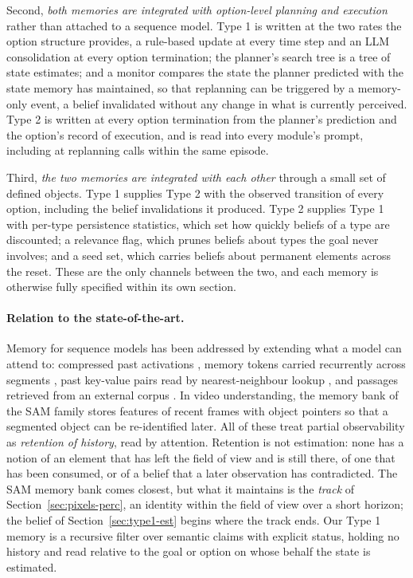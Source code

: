 \documentclass[10pt]{article}
\begin{document}
Second, \emph{both memories are integrated with option-level planning and execution} rather than attached to a sequence model. Type 1 is written at the two rates the option structure provides, a rule-based update at every time step and an LLM consolidation at every option termination; the planner's search tree is a tree of state estimates; and a monitor compares the state the planner predicted with the state memory has maintained, so that replanning can be triggered by a memory-only event, a belief invalidated without any change in what is currently perceived. Type 2 is written at every option termination from the planner's prediction and the option's record of execution, and is read into every module's prompt, including at replanning calls within the same episode.

Third, \emph{the two memories are integrated with each other} through a small set of defined objects. Type 1 supplies Type 2 with the observed transition of every option, including the belief invalidations it produced. Type 2 supplies Type 1 with per-type persistence statistics, which set how quickly beliefs of a type are discounted; a relevance flag, which prunes beliefs about types the goal never involves; and a seed set, which carries beliefs about permanent elements across the reset. These are the only channels between the two, and each memory is otherwise fully specified within its own section.

\paragraph{Relation to the state-of-the-art.}
Memory for sequence models has been addressed by extending what a model can attend to: compressed past activations \cite{rae2020compressive}, memory tokens carried recurrently across segments \cite{bulatov2022rmt}, past key-value pairs read by nearest-neighbour lookup \cite{wu2022memorizing}, and passages retrieved from an external corpus \cite{khandelwal2020knnlm}. In video understanding, the memory bank of the SAM family \cite{ravi2024sam2,carion2025sam3} stores features of recent frames with object pointers so that a segmented object can be re-identified later. All of these treat partial observability as \emph{retention of history}, read by attention. Retention is not estimation: none has a notion of an element that has left the field of view and is still there, of one that has been consumed, or of a belief that a later observation has contradicted. The SAM memory bank comes closest, but what it maintains is the \emph{track} of Section~\ref{sec:pixels-perc}, an identity within the field of view over a short horizon; the belief of Section~\ref{sec:type1-est} begins where the track ends. Our Type 1 memory is a recursive filter over semantic claims with explicit status, holding no history and read relative to the goal or option on whose behalf the state is estimated.
\end{document}
